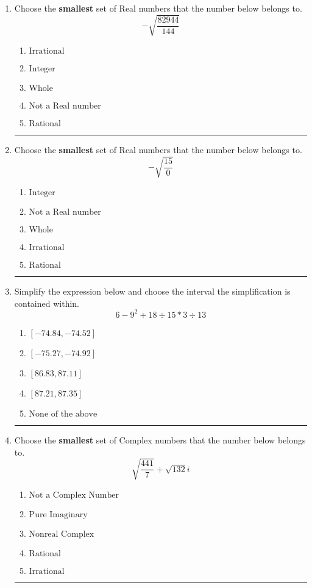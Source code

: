 \documentclass[14pt]{extbook}
\newcommand{\litem}[1]{\item#1\hspace*{-1cm}\rule{\textwidth}{0.4pt}}
\begin{document}
\begin{enumerate}
\litem{
Choose the \textbf{smallest} set of Real numbers that the number below belongs to.\[ -\sqrt{\frac{82944}{144}} \]\begin{enumerate}[label=\Alph*.]
\item \( \text{Irrational} \)
\item \( \text{Integer} \)
\item \( \text{Whole} \)
\item \( \text{Not a Real number} \)
\item \( \text{Rational} \)

\end{enumerate} }
\litem{
Choose the \textbf{smallest} set of Real numbers that the number below belongs to.\[ -\sqrt{\frac{15}{0}} \]\begin{enumerate}[label=\Alph*.]
\item \( \text{Integer} \)
\item \( \text{Not a Real number} \)
\item \( \text{Whole} \)
\item \( \text{Irrational} \)
\item \( \text{Rational} \)

\end{enumerate} }
\litem{
Simplify the expression below and choose the interval the simplification is contained within.\[ 6 - 9^2 + 18 \div 15 * 3 \div 13 \]\begin{enumerate}[label=\Alph*.]
\item \( [-74.84, -74.52] \)
\item \( [-75.27, -74.92] \)
\item \( [86.83, 87.11] \)
\item \( [87.21, 87.35] \)
\item \( \text{None of the above} \)

\end{enumerate} }
\litem{
Choose the \textbf{smallest} set of Complex numbers that the number below belongs to.\[ \sqrt{\frac{441}{7}}+\sqrt{132} i \]\begin{enumerate}[label=\Alph*.]
\item \( \text{Not a Complex Number} \)
\item \( \text{Pure Imaginary} \)
\item \( \text{Nonreal Complex} \)
\item \( \text{Rational} \)
\item \( \text{Irrational} \)


\end{enumerate}}
\end{enumerate}
\end{document}
